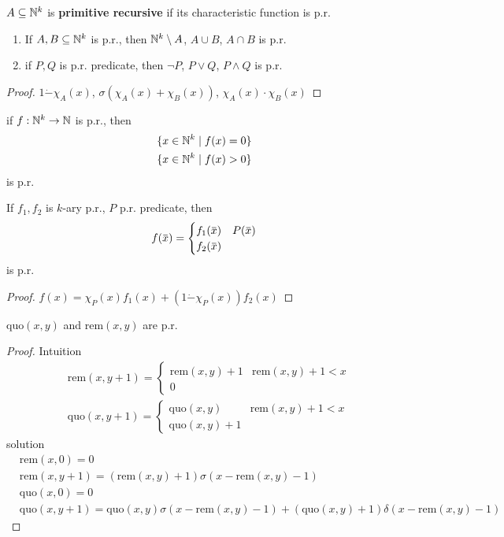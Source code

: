 \documentclass[11pt]{article}
\def \quo {\text{quo}}
\def \rem {\text{rem}}
\begin{document}
\begin{definition}[]
\(A\subseteq\mathbb{N}^k\) is \textbf{primitive recursive} if its characteristic function is p.r.
\end{definition}

\begin{lemma}[]
\begin{enumerate}
\item If \(A,B\subseteq\mathbb{N}^k\) is p.r., then \(\mathbb{N}^k\setminus A\), \(A\cup B\), \(A\cap B\) is p.r.
\item if \(P,Q\) is p.r. predicate, then \(\neg P\), \(P\vee Q\), \(P\wedge Q\) is p.r.
\end{enumerate}
\end{lemma}

\begin{proof}
\(1\dot-\chi_A(x)\), \(\sigma(\chi_A(x)+\chi_B(x))\), \(\chi_A(x)\cdot\chi_B(x)\)
\end{proof}

if \(f:\mathbb{N}^k\to\mathbb{N}\) is p.r., then
\begin{align*}
&\{x\in\mathbb{N}^k\mid f(x)=0\}\\
&\{x\in\mathbb{N}^k\mid f(x)>0\}
\end{align*}
is p.r.

\begin{lemma}[]
If \(f_1,f_2\) is \(k\)-ary p.r., \(P\) p.r. predicate, then
\begin{equation*}
f(\barx)=
\begin{cases}
f_1(\barx)&P(\barx)\\
f_2(\barx)
\end{cases}
\end{equation*}
is p.r.
\end{lemma}

\begin{proof}
\(f(x)=\chi_P(x)f_1(x)+(1\dot-\chi_P(x))f_2(x)\)
\end{proof}

\begin{lemma}[]
\(\quo(x,y)\) and \(\rem(x,y)\) are p.r.
\end{lemma}

\begin{proof}
Intuition
\begin{align*}
&\rem(x,y+1)=
\begin{cases}
\rem(x,y)+1&\rem(x,y)+1<x\\
0
\end{cases}\\
&\quo(x,y+1)=
\begin{cases}
\quo(x,y)&\rem(x,y)+1<x\\
\quo(x,y)+1
\end{cases}
\end{align*}
solution
\begin{align*}
&\rem(x,0)=0\\
&\rem(x,y+1)=(\rem(x,y)+1)\sigma(x-\rem(x,y)-1)\\
&\quo(x,0)=0\\
&\quo(x,y+1)=\quo(x,y)\sigma(x-\rem(x,y)-1)+(\quo(x,y)+1)\delta(x-\rem(x,y)-1)
\end{align*}
\end{proof}
\end{document}
